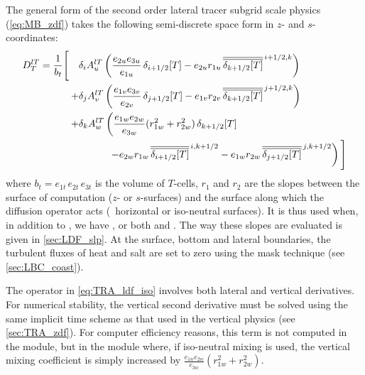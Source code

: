 \documentclass[../main/NEMO_manual]{subfiles}
\begin{document}
The general form of the second order lateral tracer subgrid scale physics (\autoref{eq:MB_zdf})
takes the following semi-discrete space form in $z$- and $s$-coordinates:
\begin{equation}
  \label{eq:TRA_ldf_iso}
  \begin{split}
    D_T^{lT} = \frac{1}{b_t} \Bigg[ \quad &\delta_i A_u^{lT} \left( \frac{e_{2u} e_{3u}}{e_{1u}}                      \, \delta_{i + 1/2} [T]
                                                                  - e_{2u} r_{1u} \, \overline{\overline{\delta_{k + 1/2} [T]}}^{\,i + 1/2,k} \right) \Bigg. \\
                                    +     &\delta_j A_v^{lT} \left( \frac{e_{1v} e_{3v}}{e_{2v}}                       \, \delta_{j + 1/2} [T]
                                                                  - e_{1v} r_{2v} \, \overline{\overline{\delta_{k + 1/2} [T]}}^{\,j + 1/2,k} \right)        \\
                                   +     &\delta_k A_w^{lT} \left( \frac{e_{1w} e_{2w}}{e_{3w}} (r_{1w}^2 + r_{2w}^2) \, \delta_{k + 1/2} [T] \right.           \\
                                   & \qquad \quad \Bigg. \left.     - e_{2w} r_{1w} \, \overline{\overline{\delta_{i + 1/2} [T]}}^{\,i,k + 1/2}
                                                                  - e_{1w} r_{2w} \, \overline{\overline{\delta_{j + 1/2} [T]}}^{\,j,k + 1/2} \right) \Bigg]
  \end{split}
\end{equation}
where $b_t = e_{1t} \, e_{2t} \, e_{3t}$  is the volume of $T$-cells,
$r_1$ and $r_2$ are the slopes between the surface of computation ($z$- or $s$-surfaces) and
the surface along which the diffusion operator acts (\ie\ horizontal or iso-neutral surfaces).
It is thus used when, in addition to ,
we have ,
or both  and .
The way these slopes are evaluated is given in \autoref{sec:LDF_slp}.
At the surface, bottom and lateral boundaries,
the turbulent fluxes of heat and salt are set to zero using the mask technique
(see \autoref{sec:LBC_coast}).

The operator in \autoref{eq:TRA_ldf_iso} involves both lateral and vertical derivatives.
For numerical stability, the vertical second derivative must be solved using
the same implicit time scheme as that used in the vertical physics (see \autoref{sec:TRA_zdf}).
For computer efficiency reasons, this term is not computed in the  module,
but in the  module where, if iso-neutral mixing is used,
the vertical mixing coefficient is simply increased by
$\frac{e_{1w} e_{2w}}{e_{3w}}(r_{1w}^2 + r_{2w}^2)$.
\end{document}
